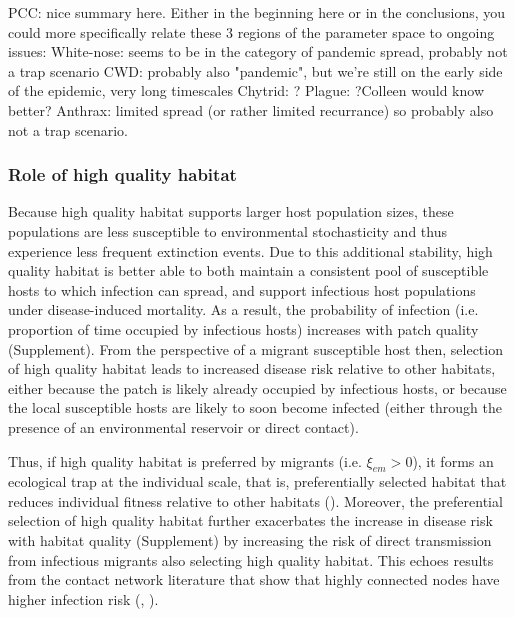 \documentclass{article}
\begin{document}
PCC: nice summary here. Either in the beginning here or in the conclusions, you could more specifically relate these 3 regions of the parameter space to ongoing issues: 
White-nose:  seems to be in the category of pandemic spread, probably not a trap scenario
CWD: probably also "pandemic", but we're still on the early side of the epidemic, very long timescales
Chytrid: ?
Plague:  ?Colleen would know better?
Anthrax: limited spread (or rather limited recurrance) so probably also not a trap scenario. 


\subsubsection*{Role of high quality habitat}

Because high quality habitat supports larger host population sizes, these populations are less susceptible to environmental stochasticity and thus experience less frequent extinction events.
Due to this additional stability, high quality habitat is better able to both maintain a consistent pool of susceptible hosts to which infection can spread, and support infectious host populations under disease-induced mortality. 
As a result, the probability of infection (i.e. proportion of time occupied by infectious hosts) increases with patch quality (Supplement).
From the perspective of a migrant susceptible host then, selection of high quality habitat leads to increased disease risk relative to other habitats, either because the patch is likely already occupied by infectious hosts, or because the local susceptible hosts are likely to soon become infected (either through the presence of an environmental reservoir or direct contact).

Thus, if high quality habitat is preferred by migrants (i.e. $\xi_{em} > 0$), it forms an ecological trap at the individual scale, that is, preferentially selected habitat that reduces individual fitness relative to other habitats (\cite{Robertson2006}).
Moreover, the preferential selection of high quality habitat further exacerbates the increase in disease risk with habitat quality (Supplement) by increasing the risk of direct transmission from infectious migrants also selecting high quality habitat.
This echoes results from the contact network literature that show that highly connected nodes have higher infection risk (\cite{Christley2005}, \cite{Keeling2005}).
\end{document}
